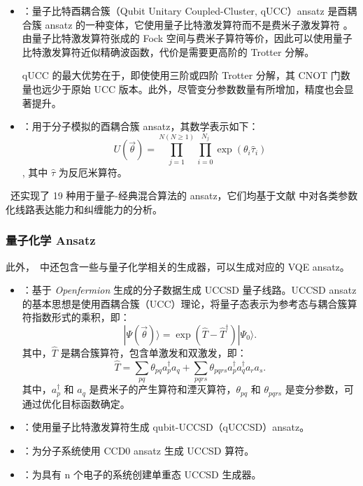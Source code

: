 \begin{itemize}
    \item \QubitUCCAnsatz：量子比特酉耦合簇（Qubit Unitary Coupled-Cluster, qUCC）ansatz 是酉耦合簇 ansatz 的一种变体，它使用量子比特激发算符而不是费米子激发算符 \cite{PhysRevA.102.062612}。由量子比特激发算符张成的 Fock 空间与费米子算符等价，因此可以使用量子比特激发算符近似精确波函数，代价是需要更高阶的 Trotter 分解。

          qUCC 的最大优势在于，即使使用三阶或四阶 Trotter 分解，其 CNOT 门数量也远少于原始 UCC 版本。此外，尽管变分参数数量有所增加，精度也会显著提升。

    \item \UCCAnsatz：用于分子模拟的酉耦合簇 ansatz，其数学表示如下：
          $$U(\vec{\theta}) = \prod_{j=1}^{N(N\ge1)}{\prod_{i=0}^{N_{j}}{\exp{(\theta_{i}\hat{\tau}_{i})}}}$$,
          其中 $\hat{\tau}$ 为反厄米算符。
\end{itemize}

\MindQuantum\ 还实现了 19 种用于量子-经典混合算法的 ansatz，它们均基于文献 \cite{Sim_2019} 中对各类参数化线路表达能力和纠缠能力的分析。

\subsubsection{量子化学 Ansatz}

此外，\MindQuantum\ 中还包含一些与量子化学相关的生成器，可以生成对应的 VQE ansatz。

\begin{itemize}
    \item \generateuccsd：基于 \textit{Openfermion} \cite{mcclean2020openfermion} 生成的分子数据生成 UCCSD 量子线路。UCCSD ansatz 的基本思想是使用酉耦合簇（UCC）理论，将量子态表示为参考态与耦合簇算符指数形式的乘积，即：
          $$
              |\Psi(\vec{\theta})\rangle = \exp(\hat{T} - \hat{T}^\dagger)|\Psi_0\rangle.
          $$
          其中，$\hat{T}$ 是耦合簇算符，包含单激发和双激发，即：
          $$
              \hat{T} = \sum_{pq}\theta_{pq}a_p^\dagger a_q + \sum_{pqrs}\theta_{pqrs}a_p^\dagger a_q^\dagger a_r a_s.
          $$
          其中，$a_p^\dagger$ 和 $a_q$ 是费米子的产生算符和湮灭算符，$\theta_{pq}$ 和 $\theta_{pqrs}$ 是变分参数，可通过优化目标函数确定。

    \item \quccsdgenerator：使用量子比特激发算符生成 qubit-UCCSD（qUCCSD）ansatz。
    \item \uccsdzerosingletgenerator：为分子系统使用 CCD0 ansatz 生成 UCCSD 算符。
    \item \uccsdsingletgenerator：为具有 n 个电子的系统创建单重态 UCCSD 生成器。
\end{itemize}

